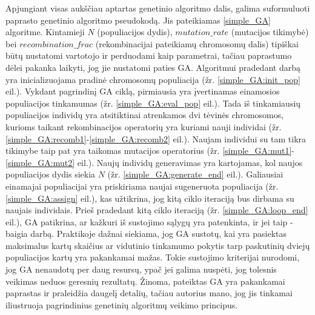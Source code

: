 \documentclass{VUMIFInfKursinis}
\begin{document}
Apjungiant visas aukščiau aptartas genetinio algoritmo dalis, galima suformuluoti paprasto genetinio algoritmo pseudokodą.
Jis pateikiamas \ref{simple_GA} algoritme.
Kintamieji $N$ (populiacijos dydis), $mutation\_rate$ (mutacijos tikimybė) bei $recombination\_frac$ (rekombinacijai pateikiamų chromosomų dalis)
tipiškai būtų nustatomi vartotojo ir perduodami kaip parametrai, tačiau paprastumo dėlei
pakanka laikyti, jog jie nustatomi paties GA.
Algoritmui pradedant darbą yra inicializuojama pradinė chromosomų populiacija (žr. \ref{simple_GA:init_pop} eil.).
Vykdant pagrindinį GA ciklą, pirmiausia
yra įvertinamas einamosios populiacijos tinkamumas (žr. \ref{simple_GA:eval_pop} eil.).
Tada iš tinkamiausių populiacijos individų yra atsitiktinai atrenkamos dvi tėvinės chromosomos,
kurioms taikant rekombinacijos operatorių yra kuriami nauji individai (žr. \ref{simple_GA:recomb1}-\ref{simple_GA:recomb2} eil.).
Naujam individui su tam tikra tikimybe taip pat yra taikomas mutacijos operatorius (žr. \ref{simple_GA:mut1}-\ref{simple_GA:mut2} eil.).
Naujų individų generavimas yra kartojamas, kol naujos populiacijos dydis siekia $N$ (žr. \ref{simple_GA:generate_end} eil.).
Galiausiai einamajai populiacijai yra priskiriama naujai sugeneruota populiacija (žr. \ref{simple_GA:assign} eil.),
kas užtikrina, jog kitą ciklo iteraciją bus dirbama su naujais individais.
Prieš pradedant kitą ciklo iteraciją (žr. \ref{simple_GA:loop_end} eil.), GA patikrina, ar kažkuri iš sustojimo sąlygų yra patenkinta, ir jei taip - baigia darbą.
Praktikoje dažnai siekiama, jog GA sustotų, kai yra pasiektas maksimalus
kartų skaičius ar vidutinio tinkamumo pokytis tarp paskutinių dviejų populiacijos kartų yra pakankamai mažas.
Tokie sustojimo kriterijai nurodomi, jog GA nenaudotų per daug resursų, ypač jei galima nuspėti, jog tolesnis veikimas neduos geresnių rezultatų.
Žinoma, pateiktas GA yra pakankamai paprastas ir praleidžia daugelį detalių, tačiau autorius mano, jog jis tinkamai iliustruoja pagrindinius genetinių algoritmų veikimo principus.
\end{document}
